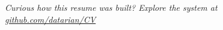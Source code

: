 \documentclass[10pt,a4paper,sans]{moderncv}
\begin{document}


\vspace{1em}
\begin{center}
\textit{\small Curious how this resume was built? Explore the system at \url{github.com/datarian/CV}}
\end{center}
\end{document}
